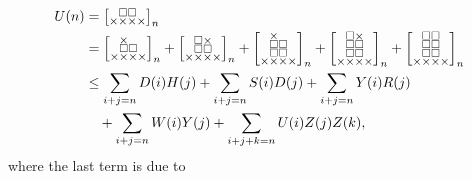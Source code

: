 \documentclass[a4paper,12pt]{article}
\makeatletter
\newenvironment{grid}
  {\begingroup\footnotesize
   \renewcommand{\arraystretch}{0}
   \setlength{\arraycolsep}{0pt}
   \left[\begin{array}{@{}*{10}{c}@{}}}
  {\end{array}\right]\endgroup}
\newcommand{\void}{\phantom{\times}}
\newcommand{\myU}{
    \begin{grid}
        \void & \square & \square & \void \\
        \times & \times & \times & \times
    \end{grid}
}
\makeatother
\begin{document}
\begin{align*}
			U(n) &= \myU_n \\
			&= \begin{grid}
			\void & \times & \void & \void \\
			\void & \square & \square & \void \\
			\times & \times & \times & \times
		    \end{grid}_n + \begin{grid}
			\void & \square & \times & \void \\
			\void & \square & \square & \void \\
			\times & \times & \times & \times
		    \end{grid}_n + \begin{grid}
			\void & \times & \void & \void \\
			\void & \square & \square & \void \\
			\void & \square & \square & \void \\
			\times & \times & \times & \times
		    \end{grid}_n + \begin{grid}
			\void & \square & \times & \void \\
			\void & \square & \square & \void \\
			\void & \square & \square & \void \\
			\times & \times & \times & \times
		    \end{grid}_n + \begin{grid}
			\void & \square & \square & \void \\
			\void & \square & \square & \void \\
			\void & \square & \square & \void \\
			\times & \times & \times & \times
		    \end{grid}_n \\
			&\le \sum_{i+j=n} D(i)H(j)
		      + \sum_{i+j=n} S(i)D(j)
		      + \sum_{i+j=n} Y(i)R(j) \\
		      & \quad + \sum_{i+j=n} W(i)Y(j)
		      + \sum_{i+j+k=n} U(i)Z(j)Z(k),
		\end{align*}
where the last term is due to
\end{document}
